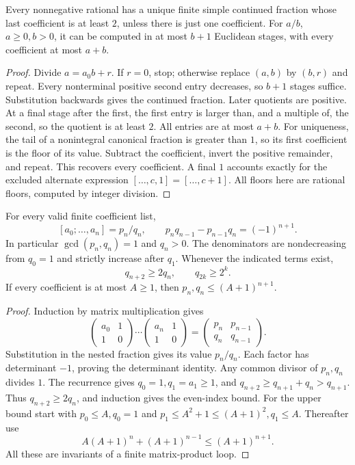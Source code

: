 \begin{theorem}\label{dio:cf-rational}
Every nonnegative rational has a unique finite simple continued fraction
whose last coefficient is at least $2$, unless there is just one
coefficient. For $a/b$, $a\geq0,b>0$, it can be computed in at most
$b+1$ Euclidean stages, with every coefficient at most $a+b$.
\end{theorem}
\begin{proof}
Divide $a=a_0b+r$. If $r=0$, stop; otherwise replace $(a,b)$ by
$(b,r)$ and repeat. Every nonterminal positive second entry decreases,
so $b+1$ stages suffice. Substitution backwards gives the continued
fraction. Later quotients are positive. At a final stage after the
first, the first entry is larger than, and a multiple of, the second,
so the quotient is at least $2$. All entries are at most $a+b$.
For uniqueness, the tail of a nonintegral canonical fraction is greater
than $1$, so its first coefficient is the floor of its value.
Subtract the coefficient, invert the positive remainder, and repeat.
This recovers every coefficient. A final $1$ accounts exactly for the
excluded alternate expression $[\ldots,c,1]=[\ldots,c+1]$.
All floors here are rational floors, computed by integer division.
\end{proof}

\begin{theorem}
\label{dio:continuants}
For every valid finite coefficient list,
\[
 [a_0;\ldots,a_n]=p_n/q_n,\qquad
 p_nq_{n-1}-p_{n-1}q_n=(-1)^{n+1}.
\]
In particular $\gcd(p_n,q_n)=1$ and $q_n>0$.
The denominators are nondecreasing from $q_0=1$ and strictly increase
after $q_1$. Whenever the indicated terms exist,
\[
 q_{n+2}\geq2q_n,\qquad q_{2k}\geq2^k.
\]
If every coefficient is at most $A\geq1$, then
$p_n,q_n\leq(A+1)^{n+1}$.
\end{theorem}
\begin{proof}
Induction by matrix multiplication gives
\[
 \begin{pmatrix}a_0&1\\1&0\end{pmatrix}\cdots
 \begin{pmatrix}a_n&1\\1&0\end{pmatrix}
 =
 \begin{pmatrix}p_n&p_{n-1}\\q_n&q_{n-1}\end{pmatrix}.
\]
Substitution in the nested fraction gives its value $p_n/q_n$.
Each factor has determinant $-1$, proving the determinant identity.
Any common divisor of $p_n,q_n$ divides $1$.
The recurrence gives $q_0=1,q_1=a_1\geq1$, and
$q_{n+2}\geq q_{n+1}+q_n>q_{n+1}$.
Thus $q_{n+2}\geq2q_n$, and induction gives the even-index bound.
For the upper bound start with $p_0\leq A,q_0=1$ and
$p_1\leq A^2+1\leq(A+1)^2,q_1\leq A$. Thereafter use
\[
 A(A+1)^n+(A+1)^{n-1}\leq(A+1)^{n+1}.
\]
All these are invariants of a finite matrix-product loop.
\end{proof}

